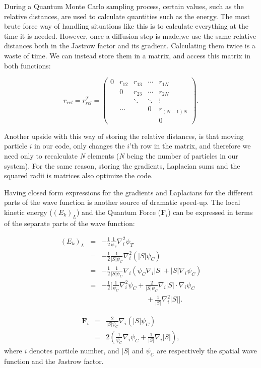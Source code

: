 During a Quantum Monte Carlo sampling process, certain values, such as the relative distances, are used to calculate quantities such as the energy. The most brute force way of handling situations like this is to calculate everything at the time it is needed. However, once a diffusion step is made,we use the same relative distances both in the Jastrow factor and its gradient. Calculating them twice is a waste of time. We can instead store them in a matrix, and access this matrix in both functions:

\[
r_{rel} = r_{rel}^T = \left( \begin{array}{ccccc}
0 & r_{12} & r_{13} & \cdots & r_{1N} \\
 & 0 & r_{23} & \cdots & r_{2N}  \\
 &  & \ddots & \ddots & \vdots \\
 & \cdots &  & 0 & r_{(N-1)N} \\
 &  &  &  & 0\end{array} \right).
\]

Another upside with this way of storing the relative distances, is that moving particle $i$ in our code, only changes the $i$'th row in the matrix, and therefore we need only to recalculate \textit{N} elements (\textit{N} being the number of particles in our system). For the same reason, storing the gradients, Laplacian sums and the squared radii is matrices also optimize the code. 

Having closed form expressions for the gradients and Laplacians for the different parts of the wave function is another source of dramatic speed-up. The local kinetic energy ($(E_k)_L$) and the Quantum Force ($\mathbf{F}_i$) can be expressed in terms of the separate parts of the wave function:

\begin{eqnarray}
(E_k)_L &=& -\frac{1}{2}\frac{1}{\psi_T}\nabla_i^2 \psi_T \\
&=& -\frac{1}{2}\frac{1}{|S|\psi_C}\nabla_i^2(|S|\psi_C) \nonumber\\
&=& -\frac{1}{2}\frac{1}{|S|\psi_C} \nabla_i \left(\psi_C\nabla_i |S| + |S|\nabla_i \psi_C\right)\nonumber  \\
&=& -\frac{1}{2}\Big[\frac{1}{\psi_C}\nabla_i^2 \psi_C + \frac{2}{|S|\psi_C}\nabla_i|S|\cdot\nabla_i\psi_C \nonumber\\
&& \qquad\qquad\qquad\,\,+\frac{1}{|S|}\nabla_i^2 |S|\Big].\nonumber 
\label{eq:kinetic_analytic}
\end{eqnarray}

\begin{eqnarray}
 \mathbf{F}_i &=& \frac{2}{|S|\psi_C}\nabla_i( |S|\psi_C) \\
&=& 2\left(\frac{1}{\psi_C}\nabla_i \psi_C + \frac{1}{|S|}\nabla_i |S|\right),\nonumber
\label{eq:QF}
\end{eqnarray}
where $i$ denotes particle number, and $|S|$ and $\psi_C$ are respectively the spatial wave function and the Jastrow factor.

